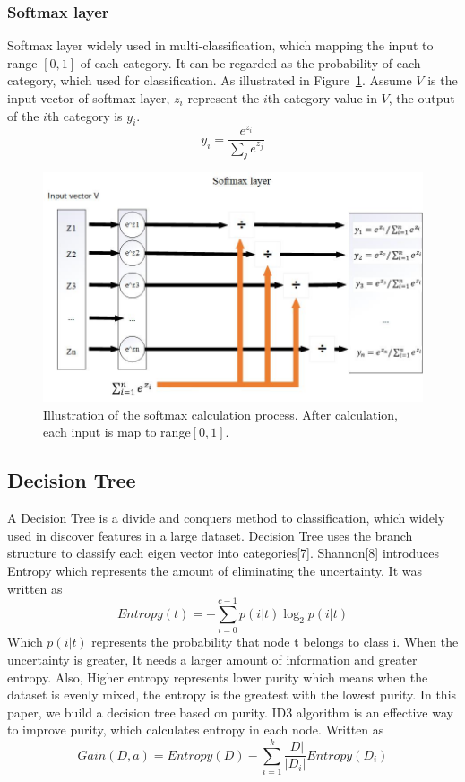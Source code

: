 \documentclass[runningheads]{llncs}
\begin{document}
\subsubsection{Softmax layer}
Softmax layer widely used in multi-classification, which mapping the input to range $[0,1]$ of each category. It can be regarded as the probability of each category, which used for classification. As illustrated in Figure~\ref{fig4}. Assume $V$ is the input vector of softmax layer, $z_i$ represent the $i$th category value in $V$, the output of the $i$th category is $y_i$.
\begin{equation}
	y_i=\frac{e^{z_i}}{\sum_j e^{z_j}}
\end{equation}

\begin{figure}
	\includegraphics[width=15cm]{fig4.jpg}
	\caption{Illustration of the softmax calculation process. After calculation, each input is map to range$[0,1]$.} \label{fig4}
\end{figure}



\subsection{Decision Tree}
A Decision Tree is a divide and conquers method to classification, which widely used in discover features in a large dataset. Decision Tree uses the branch structure to classify each eigen vector into categories[7]. Shannon[8] introduces Entropy which represents the amount of eliminating the uncertainty. It was written as
\begin{equation}
	Entropy(t)=-\sum_{i=0}^{c-1}p(i|t)\log_2p(i|t)
\end{equation}
Which $p(i|t)$ represents the probability that node t belongs to class i. When the uncertainty is greater, It needs a larger amount of information and greater entropy. Also, Higher entropy represents lower purity which means when the dataset is evenly mixed, the entropy is the greatest with the lowest purity. In this paper, we build a decision tree based on purity. ID3 algorithm is an effective way to improve purity, which calculates entropy in each node. Written as
\begin{equation}
	Gain(D,a)=Entropy(D)-\sum_{i=1}^{k}\frac{|D|}{|D_i|}Entropy(D_i)
\end{equation}
\end{document}
